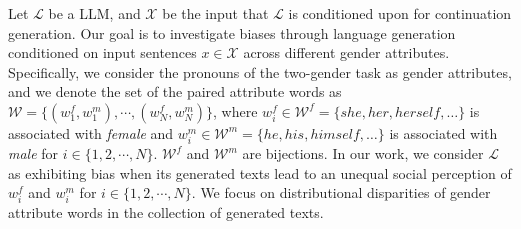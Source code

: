 \documentclass{article}
\begin{document}
Let $\mathcal{L}$ be a LLM, and 
$\mathcal{X}$ be the input that $\mathcal{L}$ is conditioned upon for continuation generation. 
Our goal is to investigate biases through language generation conditioned on input sentences $x\in\mathcal{X}$ across different gender attributes.
Specifically, we consider the pronouns of the two-gender task as gender attributes, 
and we denote the set of the
paired attribute words 
as $\mathcal{W} = \{(w^f_1, w^m_1), \cdots, (w^f_N, w^m_N)\}$, where $w^f_i\in\mathcal{W}^f=\{she, her, herself, \dots\}$ is associated with \textit{female} and $w^m_i\in\mathcal{W}^m=\{he, his, himself, \dots\}$ is associated with \textit{male} for $i\in\{1, 2, \cdots, N\}$. $\mathcal{W}^f$ and $\mathcal{W}^m$ are bijections.
In our work, we 
consider
$\mathcal{L}$ as exhibiting bias when its generated texts lead to an unequal social perception of 
$w^f_i$
and 
$w^m_i$ for $i\in\{1, 2, \cdots, N\}$. 
We focus on distributional disparities 
of gender attribute words
in the collection of generated texts.


\end{document}
